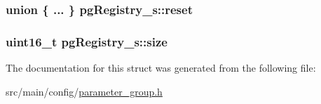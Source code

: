 \hypertarget{structpgRegistry__s_afa6fbee2a6616d202fdce647ea4fd029}{
\subsubsection[{reset}]{\setlength{\rightskip}{0pt plus 5cm}union \{ ... \}   pg\+Registry\+\_\+s\+::reset}}\label{structpgRegistry__s_afa6fbee2a6616d202fdce647ea4fd029}
\hypertarget{structpgRegistry__s_a2d0173dec2b43af8fcbd88d80ebaaf6f}{
\subsubsection[{size}]{\setlength{\rightskip}{0pt plus 5cm}uint16\+\_\+t pg\+Registry\+\_\+s\+::size}}\label{structpgRegistry__s_a2d0173dec2b43af8fcbd88d80ebaaf6f}


The documentation for this struct was generated from the following file\+:\begin{DoxyCompactItemize}
\item 
src/main/config/\hyperlink{parameter__group_8h}{parameter\+\_\+group.\+h}\end{DoxyCompactItemize}
